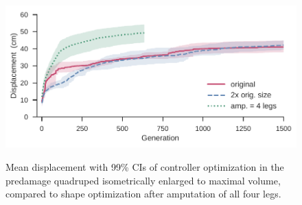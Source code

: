 

\begin{figure}
\begin{center}
\includegraphics[trim={5pt 0 0 0},clip,width=0.7\linewidth]{Chapter05/fig/RSS_Size_Effect.pdf}\\
\vspace{-6pt}
\caption{Mean displacement with 99\% CIs of controller optimization in the predamage quadruped isometrically enlarged to maximal volume, compared to shape optimization after amputation of all four legs.
}
\label{fig5:size_effect}
\vspace{-2em}
\end{center}
\end{figure}

